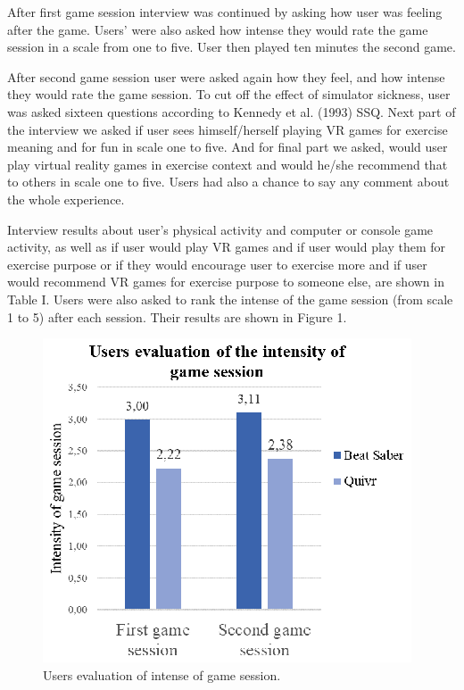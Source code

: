\documentclass{sig-alternate-05-2015}
\begin{document}
After first game session interview was continued by asking how user was 
feeling after the game. Users’ were also asked how intense they would 
rate the game session in a scale from one to five. User then played 
ten minutes the second game.

After second game session user were asked again how they feel, and 
how intense they would rate the game session. To cut off the effect 
of simulator sickness, user was asked sixteen questions according 
to Kennedy et al. (1993) SSQ. Next part of the interview we asked 
if user sees himself/herself playing VR games for exercise meaning 
and for fun in scale one to five. And for final part we asked, 
would user play virtual reality games in exercise context and would 
he/she recommend that to others in scale one to five. Users had 
also a chance to say any comment about the whole experience.

Interview results about user’s physical activity and computer or 
console game activity, as well as if user would play VR games and 
if user would play them for exercise purpose or if they would 
encourage user to exercise more and if user would recommend VR 
games for exercise purpose to someone else, are shown in Table I. 
Users were also asked to rank the intense of the game session 
(from scale 1 to 5) after each session. Their results are shown 
in Figure 1. 

\begin{figure}
\centering
\includegraphics{intensity_evaluation}
\caption
    {
        Users evaluation of intense of game session. 
    }
\end{figure}
\end{document}
